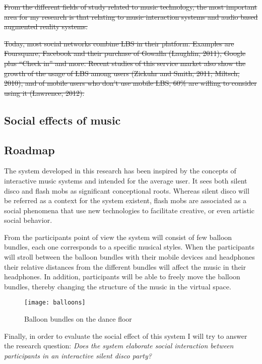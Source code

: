 \st{From the different fields of study related to music technology, the most important area for my research is that relating to music interaction systems and audio based augmented reality systems.}

\st{Today, most social networks combine LBS in their platform. Examples are Foursquare, Facebook and their purchase of Gowalla (Laughlin, 2011), Google plus ``Check in'' and more. Recent studies of this service market also show the growth of the usage of LBS among users (Zickuhr and Smith, 2011; Miltsch, 2010), and of mobile users who don't use mobile LBS, 60\% are willing to consider using it (Lawrence, 2012).}

\subsection{Social effects of music}


\subsection{Roadmap}\label{roadmap}


The system developed in this research has been inspired by the concepts of interactive music systems and intended for the average user. It sees both silent disco and flash mobs as significant conceptional roots. Whereas silent disco will be referred as a context for the system existent, flash mobs are associated as a social phenomena that use new technologies to facilitate creative, or even artistic social behavior.

From the participants point of view the system will consist of few balloon bundles, each one corresponds to a specific musical styles. When the participants will stroll between the balloon bundles with their mobile devices and headphones their relative distances from the different bundles will affect the music in their headphones. In addition, participants will be able to freely move the balloon bundles, thereby changing the structure of the music in the virtual space.

\begin{figure}[h]
	\texttt{[image: balloons]}
	\caption{Balloon bundles on the dance floor}
\end{figure}

Finally, in order to evaluate the social effect of this system I will try to answer the research question: \emph{Does the system elaborate social interaction between participants in an interactive silent disco party?}